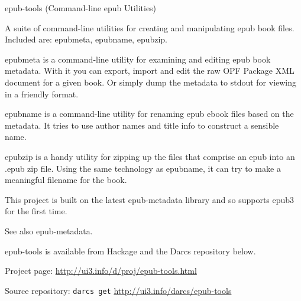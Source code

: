 \begin{hcarentry}{epub-tools (Command-line epub Utilities)}
\label{epubtools}
\makeheader

A suite of command-line utilities for creating and manipulating epub book files. Included are: epubmeta, epubname, epubzip.

epubmeta is a command-line utility for examining and editing epub book metadata. With it you can export, import and edit the raw OPF Package XML document for a given book. Or simply dump the metadata to stdout for viewing in a friendly format.

epubname is a command-line utility for renaming epub ebook files based on the metadata. It tries to use author names and title info to construct a sensible name.

epubzip is a handy utility for zipping up the files that comprise an epub into an .epub zip file. Using the same technology as epubname, it can try to make a meaningful filename for the book.

This project is built on the latest epub-metadata library and so supports epub3 for the first time.

See also epub-metadata.

epub-tools is available from Hackage and the Darcs repository below.

\FurtherReading
\begin{compactitem}
\item Project page:
\url{http://ui3.info/d/proj/epub-tools.html}

\item Source repository:
\texttt{darcs get} \url{http://ui3.info/darcs/epub-tools}
\end{compactitem}
\end{hcarentry}
